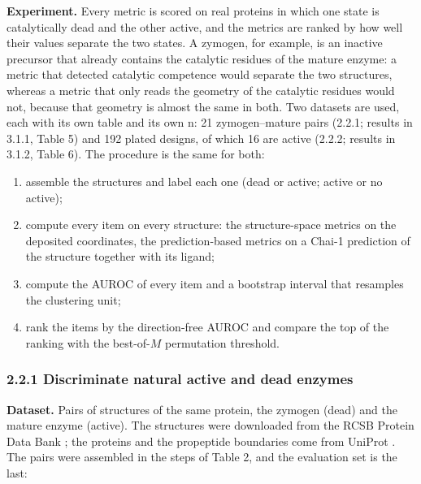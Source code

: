 \documentclass[
  10pt,
]{article}
\providecommand{\tightlist}{%
  \setlength{\itemsep}{0pt}\setlength{\parskip}{0pt}}
\DeclareRobustCommand{\_}{\textunderscore\hspace{0pt}}
\begin{document}
\textbf{Experiment.}
Every metric is
scored on real
proteins in which
one state is
catalytically dead
and the other
active, and the
metrics are ranked
by how well their
values separate the
two states. A
zymogen, for
example, is an
inactive precursor
that already
contains the
catalytic residues
of the mature
enzyme: a metric
that detected
catalytic competence
would separate the
two structures,
whereas a metric
that only reads the
geometry of the
catalytic residues
would not, because
that geometry is
almost the same in
both. Two datasets
are used, each with
its own table and
its own n: 21
zymogen--mature
pairs (2.2.1;
results in 3.1.1,
Table 5) and 192
plated designs, of
which 16 are active
(2.2.2; results in
3.1.2, Table 6). The
procedure is the
same for both:

\begin{enumerate}
\def\labelenumi{\arabic{enumi}.}
\tightlist
\item
  assemble the
  structures and
  label each one
  (dead or active;
  active or no
  active);
\item
  compute every item
  on every
  structure: the
  structure-space
  metrics on the
  deposited
  coordinates, the
  prediction-based
  metrics on a
  Chai-1
  \cite{chai2024}
  prediction of the
  structure together
  with its ligand;
\item
  compute the AUROC
  of every item and
  a bootstrap
  interval that
  resamples the
  clustering unit;
\item
  rank the items by
  the direction-free
  AUROC and compare
  the top of the
  ranking with the
  best-of-\(M\)
  permutation
  threshold.
\end{enumerate}

\subsubsection{2.2.1
Discriminate natural
active and dead
enzymes}

\textbf{Dataset.}
Pairs of structures
of the same protein,
the zymogen (dead)
and the mature
enzyme (active). The
structures were
downloaded from the
RCSB Protein Data
Bank
\cite{burley2025,berman2000};
the proteins and the
propeptide
boundaries come from
UniProt
\cite{uniprot2023}.
The pairs were
assembled in the
steps of Table 2,
and the evaluation
set is the last:
\end{document}
